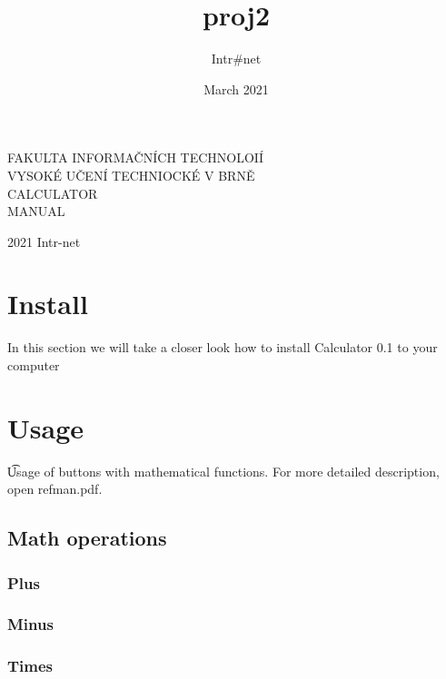 \documentclass[11pt, a4paper]{article}
\title{proj2}
\author{Intr#net}
\date{March 2021}
\begin{document}
    \begin{titlepage}
        \begin{center}
            \vspace*{1cm}

            \huge
            \Huge F\huge AKULTA INFORMAČNÍCH TECHNOLOIÍ\\
            \hspace{0.2cm}
            \Huge V\huge YSOKÉ UČENÍ TECHNIOCKÉ V \Huge B\huge RNĚ\\
            CALCULATOR \\
            MANUAL


        \end{center}
        {\LARGE 2021 \hfill
        Intr-net}
    \end{titlepage}

    \newpage

    \tableofcontents


    \section{Install}
    \label{sec:install}
    In this section we will take a closer look how to install Calculator 0.1 to your computer


    \section{Usage}
    \t Usage of buttons with mathematical functions.
    For more detailed description, open refman.pdf.
    \label{sec:usage}

    \subsection{Math operations}
    \label{subsec:mathOperations}

    \subsubsection{Plus}
    \label{subsubsec:plus}

    \subsubsection{Minus}
    \label{subsubsec:minus}

    \subsubsection{Times}
    \label{subsubsec:times}
\end{document}
